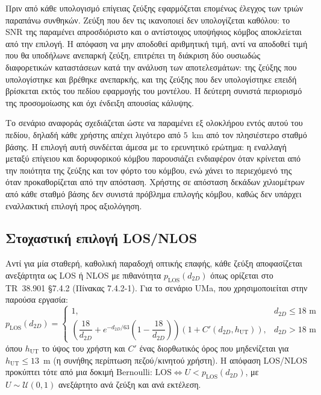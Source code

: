 Πριν από κάθε υπολογισμό επίγειας ζεύξης εφαρμόζεται επομένως έλεγχος των
τριών παραπάνω συνθηκών. Ζεύξη που δεν τις ικανοποιεί δεν υπολογίζεται
καθόλου: το SNR της παραμένει απροσδιόριστο και ο αντίστοιχος υποψήφιος
κόμβος αποκλείεται από την επιλογή. Η απόφαση να μην αποδοθεί αριθμητική
τιμή, αντί να αποδοθεί τιμή που θα υποδήλωνε ανεπαρκή ζεύξη, επιτρέπει τη
διάκριση δύο ουσιωδώς διαφορετικών καταστάσεων κατά την ανάλυση των
αποτελεσμάτων: της ζεύξης που υπολογίστηκε και βρέθηκε ανεπαρκής, και της
ζεύξης που δεν υπολογίστηκε επειδή βρίσκεται εκτός του πεδίου εφαρμογής
του μοντέλου. Η δεύτερη συνιστά περιορισμό της προσομοίωσης και όχι
ένδειξη απουσίας κάλυψης.

Το σενάριο αναφοράς σχεδιάζεται ώστε να παραμένει εξ ολοκλήρου εντός
αυτού του πεδίου, δηλαδή κάθε χρήστης απέχει λιγότερο από $5$~km από τον
πλησιέστερο σταθμό βάσης. Η επιλογή αυτή συνδέεται άμεσα με το ερευνητικό
ερώτημα: η εναλλαγή μεταξύ επίγειου και δορυφορικού κόμβου παρουσιάζει
ενδιαφέρον όταν κρίνεται από την ποιότητα της ζεύξης και τον φόρτο του
κόμβου, ενώ χάνει το περιεχόμενό της όταν προκαθορίζεται από την απόσταση.
Χρήστης σε απόσταση δεκάδων χιλιομέτρων από κάθε σταθμό βάσης δεν
συνιστά πρόβλημα επιλογής κόμβου, καθώς δεν υπάρχει εναλλακτική επιλογή
προς αξιολόγηση.

\subsection{Στοχαστική επιλογή LOS/NLOS}

Αντί για μία σταθερή, καθολική παραδοχή οπτικής επαφής, κάθε ζεύξη
αποφασίζεται ανεξάρτητα ως LOS ή NLOS με πιθανότητα $p_{\text{LOS}}(d_{2D})$
όπως ορίζεται στο TR~38.901 §7.4.2 (Πίνακας 7.4.2-1). Για το σενάριο UMa,
που χρησιμοποιείται στην παρούσα εργασία:
\begin{equation}
p_{\text{LOS}}(d_{2D}) =
\begin{cases}
1, & d_{2D} \le 18\text{~m} \\[4pt]
\left(\dfrac{18}{d_{2D}} + e^{-d_{2D}/63}\left(1 - \dfrac{18}{d_{2D}}\right)\right)
\left(1 + C'(d_{2D}, h_{\text{UT}})\right), & d_{2D} > 18\text{~m}
\end{cases}
\label{eq:los-prob-uma}
\end{equation}
όπου $h_{\text{UT}}$ το ύψος του χρήστη και $C'$ ένας διορθωτικός όρος που
μηδενίζεται για $h_{\text{UT}} \le 13$~m (η συνήθης περίπτωση πεζού/κινητού
χρήστη). Η απόφαση LOS/NLOS προκύπτει τότε από μια δοκιμή Bernoulli:
$\text{LOS} \Leftrightarrow U < p_{\text{LOS}}(d_{2D})$, με $U \sim
\mathcal{U}(0,1)$ ανεξάρτητο ανά ζεύξη και ανά εκτέλεση.

